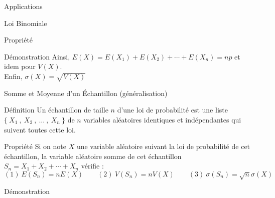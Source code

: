 \documentclass{cours}
\begin{document}
\begin{Gpartie}{Applications}
\begin{Spartie}{Loi Binomiale}
\begin{SSpartie}{Propriété}
\begin{SSSpartie}{Démonstration}
                    Ainsi, $E(X)=E\left(X_1\right)+E\left(X_2\right)+\dotsb+E\left(X_n\right)=np$ et idem pour $V(X)$. \\
                    Enfin, $\sigma(X)=\sqrt{V(X)}$
                \end{SSSpartie}
            \end{SSpartie}
        \end{Spartie}
        \begin{Spartie}{Somme et Moyenne d'un Échantillon (généralisation)} 
            \begin{SSpartie}{Définition} 
                Un échantillon de taille $n$ d'une loi de probabilité est une liste $\big\{~X_1~,~X_2~,~\dotsc~,~X_n~\big\}$ de $n$ variables aléatoires identiques et indépendantes qui suivent toutes cette loi.
            \end{SSpartie}
            \begin{SSpartie}{Propriété} 
                Si on note $X$ une variable aléatoire suivant la loi de probabilité de cet échantillon, la variable aléatoire \og somme \fg{} de cet échantillon $S_n=X_1+X_2+\dotsb+X_n$ vérifie : \[(1)~E\left(S_n\right)=nE(X)\qquad(2)~V\left(S_n\right)=nV(X)\qquad(3)~\sigma\left(S_n\right)=\sqrt{n}\sigma(X)\]
                \begin{SSSpartie}{Démonstration} 
\end{SSSpartie}
\end{SSpartie}
\end{Spartie}
\end{Gpartie}
\end{document}
